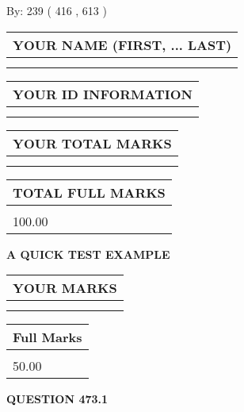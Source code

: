 \documentclass[12pt]{article}
\begin{document}
   
\hspace{1.0in} By: 
 239 ( 416 ,  613 )
   
   
   
   
\newpage 
\setcounter{page}{ 
   473001 } 
   
   
   
   
\noindent\begin{tabular}{|l|}
\hline
YOUR NAME (FIRST, ... LAST)  \\
\hline
 \\ 
 \\ 
\hline
\end{tabular}
\hspace{0.05in} \begin{tabular}{|l|}
\hline
 YOUR   ID   INFORMATION  \\
\hline
 \\ 
 \\ 
\hline
\end{tabular}
   
   
\vspace{0.2in}\noindent\begin{tabular}{|l|}
\hline
YOUR TOTAL MARKS  \\
\hline
 \\ 
 \\ 
\hline
\end{tabular}
\hspace{0.05in} \begin{tabular}{|l|}
\hline
TOTAL FULL MARKS  \\
\hline
 \\ 
100.00 \\
\hline
\end{tabular}
   
   
 \vspace{0.2in}
{\LARGE {\textbf{ A QUICK TEST EXAMPLE}}}
   
   
  
\vspace{0.2in}
  
\noindent\begin{tabular}{|l|}
\hline
 YOUR MARKS  \\
\hline
 \\ 
 \\ 
\hline
\end{tabular}
\hspace{0.05in} \begin{tabular}{|l|}
\hline
 Full Marks  \\
\hline
 \\ 
50.00 \\
\hline
\end{tabular}
{\textbf{\Large{QUESTION
473.1 
}}}
  
\end{document}
